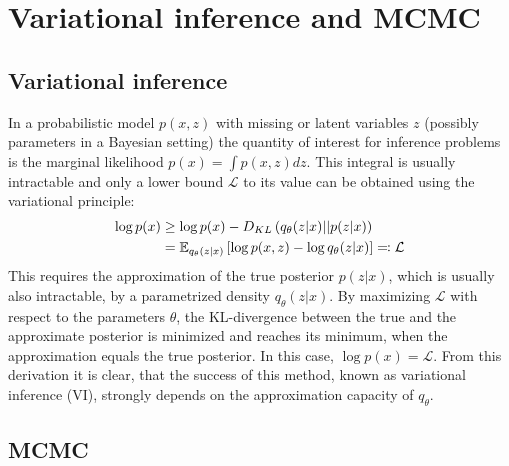 \section{Variational inference and MCMC}
\label{sec:VIandMCMC}
\subsection{Variational inference}

In a probabilistic model $p(x, z)$ with missing or latent variables $z$ (possibly parameters in a Bayesian setting) the quantity of interest for inference problems is the marginal likelihood $p(x) = \int p(x, z) dz$. This integral is usually intractable and only a lower bound $\mathcal{L}$ to its value can be obtained using the variational principle:
\begin{equation}
\begin{split}
\log p(x) &\geq \log p(x) - D_{KL} \left( q_{\theta}(z|x) || p(z|x) \right) \\
			   &=  \mathbb{E}_{q_{\theta}(z|x)} \left[ \log p(x, z) - \log q_\theta(z|x) \right] \eqqcolon \mathcal{L}
\end{split}
\end{equation}
This requires the approximation of the true posterior $p(z|x)$, which is usually also intractable, by a parametrized density $q_{\theta}(z|x)$. By maximizing $\mathcal{L}$ with respect to the parameters $\theta$, the KL-divergence between the true and the approximate posterior is minimized and reaches its minimum, when the approximation equals the true posterior. In this case, $\log p(x) = \mathcal{L}$. From this derivation it is clear, that the success of this method, known as variational inference (VI), strongly depends on the approximation capacity of $q_\theta$.

\subsection{MCMC}
\label{sec:MCMC}


